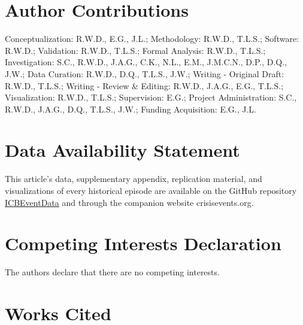 \documentclass{article}
\begin{document}
\hypertarget{author-contributions}{%
\section{Author Contributions}\label{author-contributions}}

Conceptualization: R.W.D., E.G., J.L.; Methodology: R.W.D., T.L.S.;
Software: R.W.D.; Validation: R.W.D., T.L.S.; Formal Analysis: R.W.D.,
T.L.S.; Investigation: S.C., R.W.D., J.A.G., C.K., N.L., E.M., J.M.C.N.,
D.P., D.Q., J.W.; Data Curation: R.W.D., D.Q., T.L.S., J.W.; Writing -
Original Draft: R.W.D., T.L.S.; Writing - Review \& Editing: R.W.D.,
J.A.G., E.G., T.L.S.; Visualization: R.W.D., T.L.S.; Supervision: E.G.;
Project Administration: S.C., R.W.D., J.A.G., D.Q., T.L.S., J.W.;
Funding Acquisition: E.G., J.L.

\hypertarget{data-availability-statement}{%
\section{Data Availability
Statement}\label{data-availability-statement}}

This article's data, supplementary appendix, replication material, and
visualizations of every historical episode are available on the GitHub
repository
\href{https://urldefense.com/v3/__https://github.com/CenterForPeaceAndSecurityStudies/ICBEventData__;!!Mih3wA!WxDJtEczKfxGTh0S2Krunap8ReymFEL5iTWaSfOHeqlSdyfRx77zmjBSWO1OAm13$}{ICBEventData}
and through the companion website crisisevents.org.

\hypertarget{competing-interests-declaration}{%
\section{Competing Interests
Declaration}\label{competing-interests-declaration}}

The authors declare that there are no competing interests.

\clearpage

\hypertarget{works-cited}{%
\section*{Works Cited}\label{works-cited}}
\end{document}
